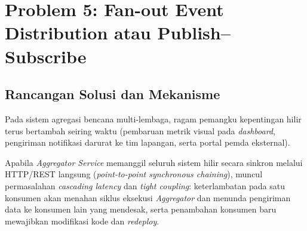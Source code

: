 \clearpage
\section{Problem 5: Fan-out Event Distribution atau Publish--Subscribe}
\label{sec:solusi_p5}

\subsection{Rancangan Solusi dan Mekanisme}
\label{subsec:p5_rancangan}
Pada sistem agregasi bencana multi-lembaga, ragam pemangku kepentingan hilir terus bertambah seiring waktu (pembaruan metrik visual pada \textit{dashboard}, pengiriman notifikasi darurat ke tim lapangan, serta portal pemda eksternal).

Apabila \textit{Aggregator Service} memanggil seluruh sistem hilir secara sinkron melalui HTTP/REST langsung (\textit{point-to-point synchronous chaining}), muncul permasalahan \textit{cascading latency} dan \textit{tight coupling}: keterlambatan pada satu konsumen akan menahan siklus eksekusi \textit{Aggregator} dan menunda pengiriman data ke konsumen lain yang mendesak, serta penambahan konsumen baru mewajibkan modifikasi kode dan \textit{redeploy}.

